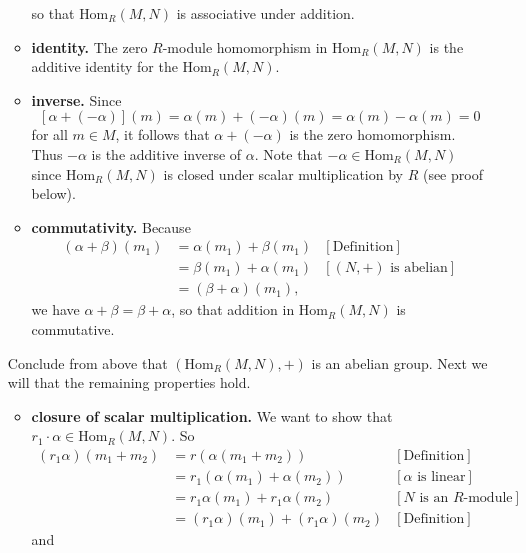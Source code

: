 \documentclass[9pt]{article}
\begin{document}
\begin{enumerate}
\begin{itemize}
               so that $\text{Hom}_R(M, N)$ is associative under addition.
         \item \textbf{identity.} The zero $R$-module homomorphism in
               $\text{Hom}_R(M, N)$ is the additive identity for the
               $\text{Hom}_R(M, N)$.
         \item \textbf{inverse.} Since
               $$[\alpha + (-\alpha)](m) = \alpha(m) + (-\alpha)(m) =
                 \alpha(m) - \alpha(m) = 0$$
               for all $m \in M$, it follows that $\alpha + (-\alpha)$ is the
               zero homomorphism. Thus $-\alpha$ is the additive inverse of
               $\alpha$. Note that $-\alpha \in \text{Hom}_R(M, N)$ since
               $\text{Hom}_R(M, N)$ is closed under scalar multiplication by
               $R$ (see proof below).
         \item \textbf{commutativity.} Because
               \begin{align*}
                  (\alpha+\beta)(m_1) &= \alpha(m_1) + \beta(m_1)
                     &[\text{Definition}] \\
                     &= \beta(m_1) + \alpha(m_1) &[(N, +) \text{ is abelian}] \\
                     &= (\beta+\alpha)(m_1),
               \end{align*}
               we have $\alpha + \beta = \beta + \alpha$, so that addition in
               $\text{Hom}_R(M, N)$ is commutative.
      \end{itemize}
      Conclude from above that $(\text{Hom}_R(M, N), +)$ is an abelian group.
      Next we will that the remaining properties hold.
      \begin{itemize}
         \item \textbf{closure of scalar multiplication.} We want to show that
               $r_1 \cdot \alpha \in \text{Hom}_R(M, N)$. So 
               \begin{align*}
                  (r_1\alpha)(m_1 + m_2) &= r (\alpha(m_1 + m_2)) &[\text{Definition}] \\
                     &= r_1(\alpha(m_1) + \alpha(m_2)) &[\alpha \text{ is linear}] \\
                     &= r_1\alpha(m_1) + r_1\alpha(m_2)
                        &[N \text{ is an } R\text{-module}] \\
                     &= (r_1\alpha)(m_1) + (r_1\alpha)(m_2) &[\text{Definition}]
               \end{align*}
               and
               \begin{align*}

\end{align*}
\end{itemize}
\end{enumerate}
\end{document}
